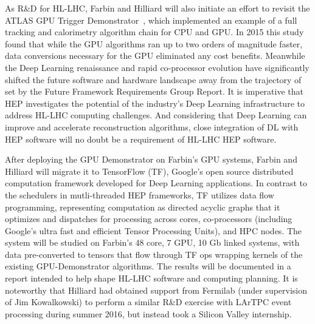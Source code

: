 

As R\&D for HL-LHC, Farbin and Hilliard will also initiate an effort to
revisit the ATLAS GPU Trigger Demonstrator~\cite{}, which implemented
an example of a full tracking and calorimetry algorithm chain for CPU
and GPU.  In 2015 this study found that while the GPU algorithms ran
up to two orders of magnitude faster, data conversions necessary for
the GPU eliminated any cost benefits. Meanwhile the Deep Learning
renaissance and rapid co-processor evolution have significantly
shifted the future software and hardware landscape away from the
trajectory of set by the Future Framework Requirements Group
Report. It is imperative that HEP investigates the potential of the
industry's Deep Learning infrastructure to address HL-LHC computing
challenges. And considering that Deep Learning can improve and
accelerate reconstruction algorithms, close integration of DL with HEP
software will no doubt be a requirement of HL-LHC HEP software.

After deploying the GPU Demonstrator on Farbin's GPU systems, Farbin
and Hilliard will migrate it to TensorFlow (TF), Google's open source
distributed computation framework developed for Deep Learning
applications.  In contrast to the schedulers in mutli-threaded HEP
frameworks, TF utilizes data flow programming, representing
computation as directed acyclic graphs that it optimizes and
dispatches for processing across cores, co-processors (including
Google's ultra fast and efficient Tensor Processing Units), and HPC
nodes.  The system will be studied on Farbin's 48 core, 7 GPU, 10 Gb
linked systems, with data pre-converted to tensors that flow through
TF ops wrapping kernels of the existing GPU-Demonstrator
algorithms. The results will be documented in a report intended to
help shape HL-LHC software and computing planning. It is noteworthy
that Hilliard had obtained support from Fermilab (under supervision of
Jim Kowalkowski) to perform a similar R\&D exercise with LArTPC event
processing during summer 2016, but instead took a Silicon Valley
internship.



